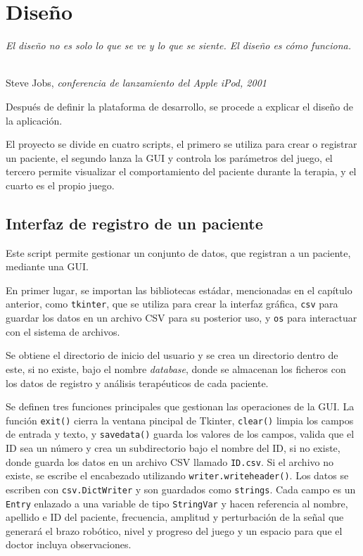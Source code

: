 \chapter{Diseño}
\label{cap:capitulo4}

\begin{flushright}
\begin{minipage}[]{9cm}
\emph{El diseño no es solo lo que se ve y lo que se siente. El diseño es cómo funciona.}\\
\end{minipage}\\

Steve Jobs, \textit{conferencia de lanzamiento del Apple iPod, 2001}\\
\end{flushright}

\vspace{1cm}

Después de definir la plataforma de desarrollo, se procede a explicar el diseño de la aplicación.

El proyecto se divide en cuatro scripts, el primero se utiliza para crear o registrar un paciente, el segundo lanza la GUI y controla los parámetros del juego, el tercero permite visualizar el comportamiento del paciente durante la terapia, y el cuarto es el propio juego.

\section{Interfaz de registro de un paciente}
\label{section:registro}

Este script permite gestionar un conjunto de datos, que registran a un paciente, mediante una GUI.

En primer lugar, se importan las bibliotecas estádar, mencionadas en el capítulo anterior, como \verb|tkinter|, que se utiliza para crear la interfaz gráfica, \verb|csv| para guardar los datos en un archivo CSV para su posterior uso, y \verb|os| para interactuar con el sistema de archivos.

Se obtiene el directorio de inicio del usuario y se crea un directorio dentro de este, si no existe, bajo el nombre \textit{database}, donde se almacenan los ficheros con los datos de registro y análisis terapéuticos de cada paciente.

Se definen tres funciones principales que gestionan las operaciones de la GUI.
La función \verb|exit()| cierra la ventana pincipal de Tkinter, \verb|clear()| limpia los campos de entrada y texto, y \verb|savedata()| guarda los valores de los campos, valida que el ID sea un número y crea un subdirectorio bajo el nombre del ID, si no existe, donde guarda los datos en un archivo CSV llamado \verb|ID.csv|.
Si el archivo no existe, se escribe el encabezado utilizando \verb|writer.writeheader()|.
Los datos se escriben con \verb|csv.DictWriter| y son guardados como \verb|strings|.
Cada campo es un \verb|Entry| enlazado a una variable de tipo \verb|StringVar| y hacen referencia al nombre, apellido e ID del paciente, frecuencia, amplitud y perturbación de la señal que generará el brazo robótico, nivel y progreso del juego y un espacio para que el doctor incluya observaciones.

